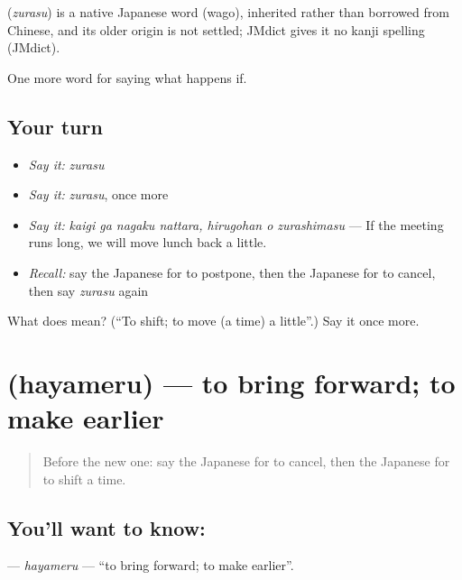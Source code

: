 \begin{cousinweb}
\textbf{} (\emph{zurasu}) is a native Japanese word (wago), inherited rather than borrowed from Chinese, and its older origin is not settled; JMdict gives it no kanji spelling (JMdict).
\end{cousinweb}

\begin{grammarlens}[title={What you've built}]
One more word for saying what happens if.
\end{grammarlens}

\subsection*{Your turn}
\begin{itemize}
\raggedright
  \item \emph{Say it:} \emph{zurasu}
  \item \emph{Say it:} \emph{zurasu}, once more
  \item \emph{Say it:} \emph{kaigi ga nagaku nattara, hirugohan o zurashimasu} — If the meeting runs long, we will move lunch back a little.
  \item \emph{Recall:} say the Japanese for to postpone, then the Japanese for to cancel, then say \emph{zurasu} again
\end{itemize}

\begin{tcolorbox}[breakable,colback=teal!4,colframe=teal!35!black,title={Before you move on}]
What does  mean? (\textquotedblleft{}To shift; to move (a time) a little\textquotedblright{}.) Say it once more.
\end{tcolorbox}
\section[\texorpdfstring{\ja{はやめる} (hayameru)}{はやめる (hayameru)}]{ (hayameru) — to bring forward; to make earlier}

\label{lesson:JA-C345-hayameru}



\begin{quote}
Before the new one: say the Japanese for to cancel, then the Japanese for to shift a time.
\end{quote}

\subsection*{You'll want to know: }
\textbf{} — \emph{hayameru} — \textquotedblleft{}to bring forward; to make earlier\textquotedblright{}.


